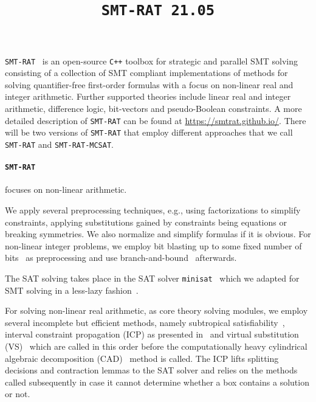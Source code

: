 \documentclass{article}
\title{\texttt{SMT-RAT 21.05}}
\begin{document}
\maketitle

\texttt{SMT-RAT}~\cite{Corzilius2015} is an open-source \texttt{C++} toolbox for strategic and parallel SMT solving consisting of a collection of SMT compliant implementations of methods for
solving quantifier-free first-order formulas with a focus on non-linear real and integer arithmetic.
Further supported theories include linear real and integer arithmetic, difference logic, bit-vectors and pseudo-Boolean constraints.
A more detailed description of \texttt{SMT-RAT} can be found at \href{https://smtrat.github.io/}{\color{blue}https://smtrat.github.io/}.
There will be two versions of \texttt{SMT-RAT} that employ different approaches that we call \texttt{SMT-RAT} and \texttt{SMT-RAT-MCSAT}.



\paragraph{\texttt{SMT-RAT}} focuses on non-linear arithmetic.

We apply several preprocessing techniques, e.g., using factorizations to simplify constraints, applying substitutions gained by constraints being equations or breaking symmetries. We also normalize and simplify formulas if it is obvious. For non-linear integer problems, we employ bit blasting up to some fixed number of bits~\cite{kruger2015bitvectors} as preprocessing and use branch-and-bound~\cite{Kremer2016} afterwards.

The SAT solving takes place in the SAT solver \texttt{minisat}~\cite{Een2003} which we adapted for SMT solving in a less-lazy fashion~\cite{sebastiani2007lazy}.

For solving non-linear real arithmetic, as core theory solving modules, we employ several incomplete but efficient methods, namely subtropical satisfiability~\cite{Fontaine2017}, interval constraint propagation (ICP) as presented in~\cite{GGIGSC10} and virtual substitution (VS)~\cite{Article_Corzilius_FCT2011} which are called in this order before the computationally heavy cylindrical algebraic decomposition (CAD)~\cite{Loup2013} method is called. The ICP lifts splitting decisions and contraction lemmas to the SAT solver and relies on the methods called subsequently in case it cannot determine whether a box contains a solution or not. 
\end{document}
